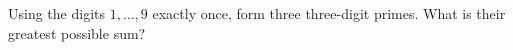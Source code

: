 Using the digits $1,\ldots,9$ exactly once, form three three-digit primes. What is their greatest possible sum?
